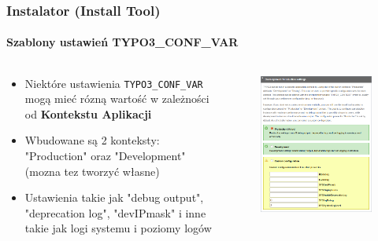 
\begin{frame}[fragile]
	\frametitle{Instalator (Install Tool)}
	\framesubtitle{Szablony ustawień TYPO3\_CONF\_VAR}

	\begin{columns}[T]
		\begin{column}{.5\textwidth}

			\begin{itemize}
				\item Niektóre ustawienia \texttt{TYPO3\_CONF\_VAR} mogą mieć rózną wartość w zależności od \textbf{Kontekstu Aplikacji}
				\item Wbudowane są 2 konteksty: "Production" oraz "Development"\newline
					(mozna tez tworzyć własne)
				\item Ustawienia takie jak "debug output", "deprecation log", "devIPmask" i inne takie jak logi systemu i poziomy logów
				
			\end{itemize}

		\end{column}
		\begin{column}{.5\textwidth}

			\begin{figure}\vspace*{-0.4cm}
				\includegraphics[width=0.8\linewidth]{Images/InstallTool/PresetsOfSettings.png}
			\end{figure}

		\end{column}
	\end{columns}

\end{frame}


